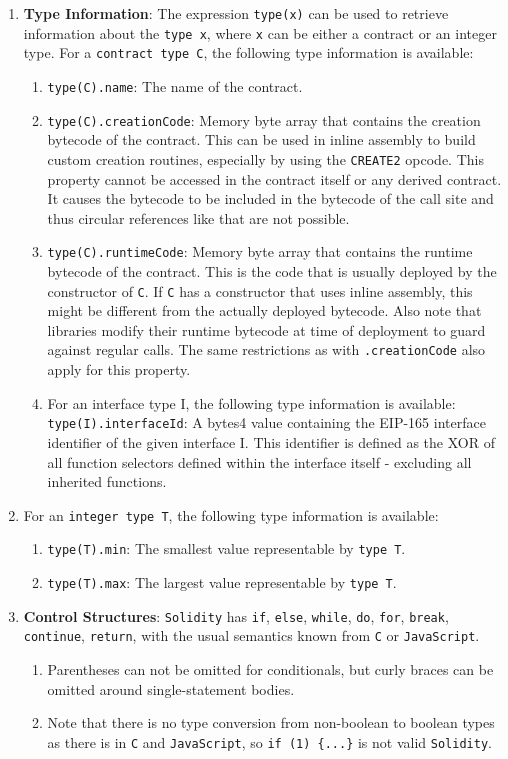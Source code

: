 \begin{enumerate}
\item\textbf{Type Information}: The expression \verb|type(x)| can be used to retrieve information about the \verb|type x|, where \verb|x| can be either a contract or an integer type. For a \verb|contract type C|, the following type information is available:
    \begin{enumerate}
    \item\verb|type(C).name|: The name of the contract.
    \item\verb|type(C).creationCode|: Memory byte array that contains the creation bytecode of the contract. This can be used in inline assembly to build custom creation routines, especially by using the \verb|CREATE2| opcode. This property cannot be accessed in the contract itself or any derived contract. It causes the bytecode to be included in the bytecode of the call site and thus circular references like that are not possible.
    \item\verb|type(C).runtimeCode|: Memory byte array that contains the runtime bytecode of the contract. This is the code that is usually deployed by the constructor of \verb|C|. If \verb|C| has a constructor that uses inline assembly, this might be different from the actually deployed bytecode. Also note that libraries modify their runtime bytecode at time of deployment to guard against regular calls. The same restrictions as with \verb|.creationCode| also apply for this property.
    \item For an interface type I, the following type information is available: \verb|type(I).interfaceId|: A bytes4 value containing the EIP-165 interface identifier of the given interface I. This identifier is defined as the XOR of all function selectors defined within the interface itself - excluding all inherited functions.
    \end{enumerate}

\item For an \verb|integer type T|, the following type information is available:
    \begin{enumerate}
    \item\verb|type(T).min|: The smallest value representable by \verb|type T|.
    \item\verb|type(T).max|: The largest value representable by \verb|type T|.
    \end{enumerate}

\item\textbf{Control Structures}: \verb|Solidity| has \verb|if|, \verb|else|, \verb|while|, \verb|do|, \verb|for|, \verb|break|, \verb|continue|, \verb|return|, with the usual semantics known from \verb|C| or \verb|JavaScript|.
    \begin{enumerate}
    \item Parentheses can not be omitted for conditionals, but curly braces can be omitted around single-statement bodies.
    \item Note that there is no type conversion from non-boolean to boolean types as there is in \verb|C| and \verb|JavaScript|, so \verb|if (1) {...}| is not valid \verb|Solidity|.
    \end{enumerate}


\end{enumerate}
